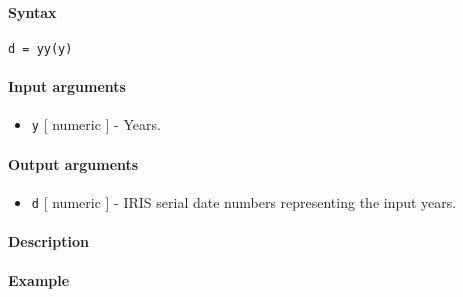 


	\paragraph{Syntax}\label{syntax}

\begin{verbatim}
d = yy(y)
\end{verbatim}

\paragraph{Input arguments}\label{input-arguments}

\begin{itemize}
\itemsep1pt\parskip0pt
\item
  \texttt{y} {[} numeric {]} - Years.
\end{itemize}

\paragraph{Output arguments}\label{output-arguments}

\begin{itemize}
\itemsep1pt\parskip0pt
\item
  \texttt{d} {[} numeric {]} - IRIS serial date numbers representing the
  input years.
\end{itemize}

\paragraph{Description}\label{description}

\paragraph{Example}\label{example}


